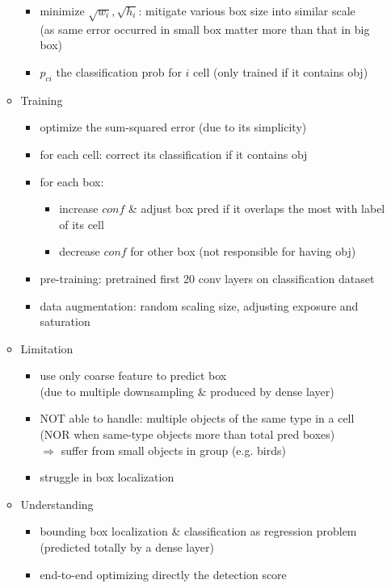 \begin{itemize}
\begin{itemize}
\begin{itemize}
		\item minimize $\sqrt{w_i}, \sqrt{h_i}$: mitigate various box size into similar scale \\ 
		(as same error occurred in small box matter more than that in big box)
		\item $p_{ci}$ the classification prob for $i$ cell (only trained if it contains obj)
		\end{itemize}
	\item Training
		\begin{itemize}
		\item optimize the sum-squared error (due to its simplicity)
		\item for each cell: correct its classification if it contains obj
		\item for each box:
			\begin{itemize}
			\item increase $conf$ \& adjust box pred if it overlaps the most with label of its cell
			\item decrease $conf$ for other box (not responsible for having obj)
			\end{itemize}
		\item pre-training: pretrained first 20 conv layers on classification dataset
		\item data augmentation: random scaling size, adjusting exposure and saturation
		\end{itemize}
	\item Limitation
		\begin{itemize}
		\item use only coarse feature to predict box \\ 
		(due to multiple downsampling \& produced by dense layer)
		\item NOT able to handle: multiple objects of the same type in a cell \\
		(NOR when same-type objects more than total pred boxes) \\
		$\Rightarrow$ suffer from small objects in group (e.g. birds)
		\item struggle in box localization
		\end{itemize}
	\item Understanding
		\begin{itemize}
		\item bounding box localization \& classification as regression problem \\
		(predicted totally by a dense layer)
		\item end-to-end optimizing directly the detection score \\

\end{itemize}
\end{itemize}
\end{itemize}
